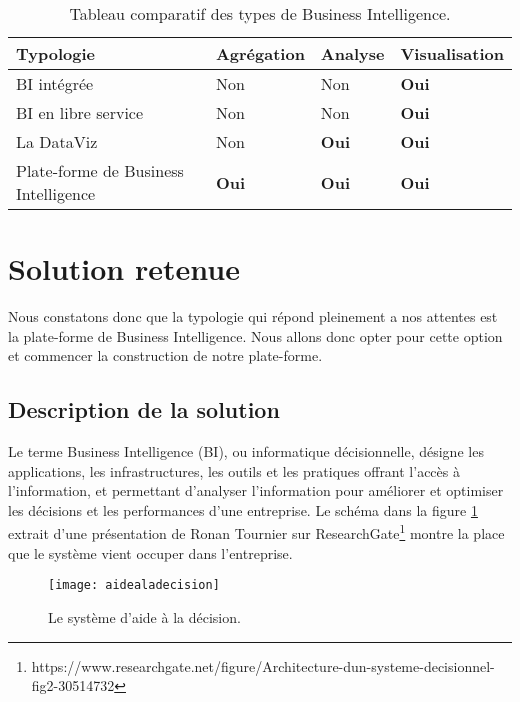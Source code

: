 \begin{table}[H]
    \centering
    \caption{Tableau comparatif des types de Business Intelligence.}
    \begin{tabular}[t]{|p{6cm}|p{3cm}|p{3cm}|p{3cm}|} 
        \hline
        \textbf{Typologie} & \textbf{Agrégation} & \textbf{Analyse} & \textbf{Visualisation} \\
        \hline\hline
        BI intégrée & Non & Non & \textbf{Oui} \\
        \hline
        BI en libre service & Non & Non & \textbf{Oui} \\
        \hline
        La DataViz & Non & \textbf{Oui} & \textbf{Oui} \\
        \hline
        Plate-forme de Business Intelligence & \textbf{Oui} & \textbf{Oui} & \textbf{Oui} \\
        \hline\hline
    \end{tabular}
    \label{tab:comparatiftypebi}
\end{table}%



\section{Solution retenue}
Nous constatons donc que la typologie qui répond pleinement a nos attentes est la plate-forme de Business Intelligence. Nous allons donc opter pour cette option et commencer la construction de notre plate-forme.

\subsection{Description de la solution}
Le terme Business Intelligence (BI), ou informatique décisionnelle, désigne les applications, les infrastructures, les outils et les pratiques offrant l’accès à l’information, et permettant d’analyser l’information pour améliorer et optimiser les décisions et les performances d’une entreprise. Le schéma dans la figure \ref{fig:aidealadecision} extrait d'une présentation de Ronan Tournier sur ResearchGate\footnote{https://www.researchgate.net/figure/Architecture-dun-systeme-decisionnel-fig2-30514732} montre la place que le système vient occuper dans l'entreprise.

\begin{figure}[H]
    \centering
    \texttt{[image: aidealadecision]}
    \caption{Le système d'aide à la décision.}
    \label{fig:aidealadecision}
\end{figure}

